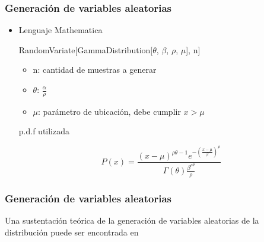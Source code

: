 \begin{frame}
    \frametitle{Generación de variables aleatorias}

    \begin{itemize}
        \item Lenguaje Mathematica \cite{mathematica}

        \vspace{0.5cm}

        RandomVariate[GammaDistribution[$\theta$, $\beta$, $\rho$, $\mu$], n]

        \begin{itemize}
            \item n: cantidad de muestras a generar
            \item $\theta$: $\frac{\alpha}{\rho}$
            \item $\mu$: parámetro de ubicación, debe cumplir $x>\mu$
        \end{itemize}

        \vspace{0.5cm}

        p.d.f utilizada

        \begin{equation*}
            P(x) = \frac{(x-\mu)^{\rho \theta - 1} e^{- \left( \frac{x-\mu}{\beta} \right)^\rho}}{\Gamma (\theta) \frac{\beta^{\rho \theta}}{\rho}}
        \end{equation*}
    \end{itemize}
\end{frame}

\begin{frame}
    \frametitle{Generación de variables aleatorias}

    Una sustentación teórica de la generación de variables aleatorias de la
    distribución puede ser encontrada en \cite{generation}
\end{frame}
